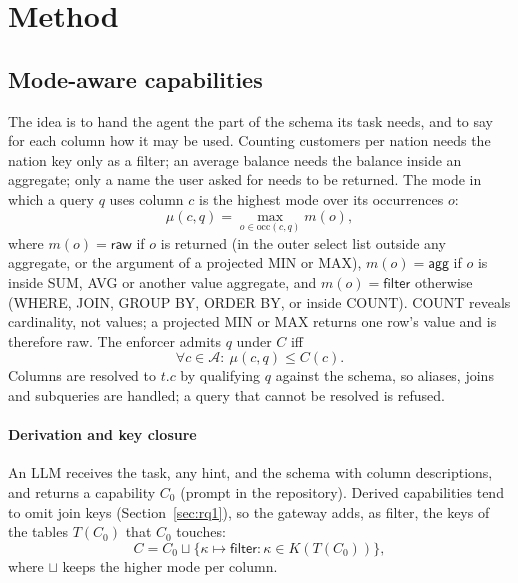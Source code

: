 \documentclass[10pt,journal,compsoc]{IEEEtran}
\begin{document}
\section{Method}\label{sec:method}

\subsection{Mode-aware capabilities}\label{sec:capability}
The idea is to hand the agent the part of the schema its task needs, and to say for each column how it may be used. Counting customers per nation needs the nation key only as a filter; an average balance needs the balance inside an aggregate; only a name the user asked for needs to be returned. The mode in which a query $q$ uses column $c$ is the highest mode over its occurrences $o$:
\begin{equation}\label{eq:mode}
\mu(c,q)=\max_{o\in\mathrm{occ}(c,q)} m(o),
\end{equation}
where $m(o)=\textsf{raw}$ if $o$ is returned (in the outer select list outside any aggregate, or the argument of a projected MIN or MAX), $m(o)=\textsf{agg}$ if $o$ is inside SUM, AVG or another value aggregate, and $m(o)=\textsf{filter}$ otherwise (WHERE, JOIN, GROUP BY, ORDER BY, or inside COUNT). COUNT reveals cardinality, not values; a projected MIN or MAX returns one row's value and is therefore raw. The enforcer admits $q$ under $C$ iff
\begin{equation}\label{eq:admit}
\forall c\in\mathcal{A}:\ \mu(c,q)\le C(c).
\end{equation}
Columns are resolved to $t.c$ by qualifying $q$ against the schema, so aliases, joins and subqueries are handled; a query that cannot be resolved is refused.

\paragraph*{Derivation and key closure} An LLM receives the task, any hint, and the schema with column descriptions, and returns a capability $C_0$ (prompt in the repository). Derived capabilities tend to omit join keys (Section~\ref{sec:rq1}), so the gateway adds, as \textsf{filter}, the keys of the tables $T(C_0)$ that $C_0$ touches:
\begin{equation}\label{eq:closure}
C=C_0\sqcup\{\kappa\mapsto\textsf{filter}:\kappa\in K(T(C_0))\},
\end{equation}
where $\sqcup$ keeps the higher mode per column.
\end{document}
